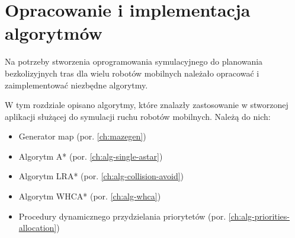 \chapter{Opracowanie i implementacja algorytmów}
\label{ch:alg-impl}

Na potrzeby stworzenia oprogramowania symulacyjnego do planowania bezkolizyjnych tras dla wielu robotów mobilnych należało opracować i zaimplementować niezbędne algorytmy.

W tym rozdziale opisano algorytmy, które znalazły zastosowanie w stworzonej aplikacji służącej do symulacji ruchu robotów mobilnych. Należą do nich:
\begin{itemize}
	\item Generator map (por. \ref{ch:mazegen})
	\item Algorytm A* (por. \ref{ch:alg-single-astar})
	\item Algorytm LRA* (por. \ref{ch:alg-collision-avoid})
	\item Algorytm WHCA* (por. \ref{ch:alg-whca})
	\item Procedury dynamicznego przydzielania priorytetów (por. \ref{ch:alg-priorities-allocation})
\end{itemize}
